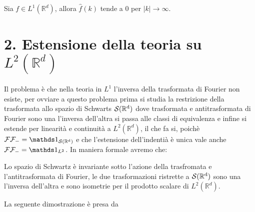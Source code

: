 \begin{proposition}
    Sia $f \in L^1(\mathbb{R}^d)$, allora $\hat{f}(k)$ tende a $0$ per $|k| \to \infty$.
\end{proposition}



\section*{2. Estensione della teoria su $L^2(\mathbb{R}^d)$}
Il problema è che nella teoria in $L^1$ l'inversa della trasformata di Fourier non esiste, per ovviare a questo problema prima si studia la restrizione della trasformata allo spazio di Schwarts $\operatorname{\mathcal{S}(\mathbb{R}^d)}$ dove trasformata e antitrasformata di Fourier sono una l'inversa dell'altra si passa alle classi di equivalenza e infine si estende per linearità e continuità a $L^2(\mathbb{R}^d)$, il che fa si, poichè $\mathcal{F}\mathcal{F}_- = \un_{\Sw}$ e che l'estensione dell'indentià è unica vale anche $\mathcal{F}\mathcal{F}_- = \un_{L^2}$. In maniera formale avremo che:
\begin{theorem}
    Lo spazio di Schwartz è invariante sotto l'azione della trasfromata e l'antitrasformata di Fourier, le due trasformazioni ristrette a $\operatorname{\mathcal{S}(\mathbb{R}^d)}$ sono una l'inversa dell'altra e sono isometrie per il prodotto scalare di $L^2(\mathbb{R}^d)$. \label{thm:Fourier}
\end{theorem}

La seguente dimostrazione è presa da \cite{Mor}

